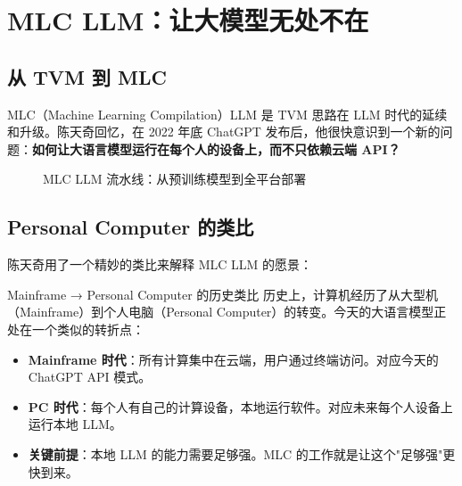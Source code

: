 \documentclass[a4paper]{article}
\begin{document}
\section{MLC LLM：让大模型无处不在}

\subsection{从 TVM 到 MLC}

MLC（Machine Learning Compilation）LLM 是 TVM 思路在 LLM 时代的延续和升级。陈天奇回忆，在 2022 年底 ChatGPT 发布后，他很快意识到一个新的问题：\textbf{如何让大语言模型运行在每个人的设备上，而不只依赖云端 API？}

\begin{figure}[H]
\centering
{}
\caption{MLC LLM 流水线：从预训练模型到全平台部署}
\end{figure}

\subsection{Personal Computer 的类比}

陈天奇用了一个精妙的类比来解释 MLC LLM 的愿景：

\begin{importantbox}{Mainframe → Personal Computer 的历史类比}
历史上，计算机经历了从大型机（Mainframe）到个人电脑（Personal Computer）的转变。今天的大语言模型正处在一个类似的转折点：
\begin{itemize}
\item \textbf{Mainframe 时代}：所有计算集中在云端，用户通过终端访问。对应今天的 ChatGPT API 模式。
\item \textbf{PC 时代}：每个人有自己的计算设备，本地运行软件。对应未来每个人设备上运行本地 LLM。
\item \textbf{关键前提}：本地 LLM 的能力需要足够强。MLC 的工作就是让这个"足够强"更快到来。
\end{itemize}
\end{importantbox}
\end{document}
